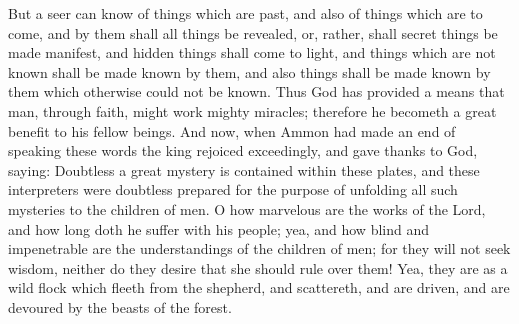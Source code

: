 \bverse \iffalse But a seer can know of things which are past, and also of things which are to come, and by them shall all things be revealed, or, rather, shall secret things be made manifest, and hidden things shall come to light, and things which are not known shall be made known by them, and also things shall be made known by them which otherwise could not be known. \fi
But a seer can know of things which are past, and also of things which are to come, and by them shall all things be revealed, or, rather, shall secret things be made manifest, and hidden things shall come to light, and things which are not known shall be made known by them, and also things shall be made known by them which otherwise could not be known.
\bverse \iffalse Thus God has provided a means that man, through faith, might work mighty miracles; therefore he becometh a great benefit to his fellow beings. \fi
Thus God has provided a means that man, through faith, might work mighty miracles; therefore he becometh a great benefit to his fellow beings.
\bverse \iffalse And now, when Ammon had made an end of speaking these words the king rejoiced exceedingly, and gave thanks to God, saying: Doubtless a great mystery is contained within these plates, and these interpreters were doubtless prepared for the purpose of unfolding all such mysteries to the children of men. \fi
And now, when Ammon had made an end of speaking these words the king rejoiced exceedingly, and gave thanks to God, saying: Doubtless a great mystery is contained within these plates, and these interpreters were doubtless prepared for the purpose of unfolding all such mysteries to the children of men.
\bverse \iffalse O how marvelous are the works of the Lord, and how long doth he suffer with his people; yea, and how blind and impenetrable are the understandings of the children of men; for they will not seek wisdom, neither do they desire that she should rule over them! \fi
O how marvelous are the works of the Lord, and how long doth he suffer with his people; yea, and how blind and impenetrable are the understandings of the children of men; for they will not seek wisdom, neither do they desire that she should rule over them!
\bverse \iffalse Yea, they are as a wild flock which fleeth from the shepherd, and scattereth, and are driven, and are devoured by the beasts of the forest. \fi
Yea, they are as a wild flock which fleeth from the shepherd, and scattereth, and are driven, and are devoured by the beasts of the forest.

